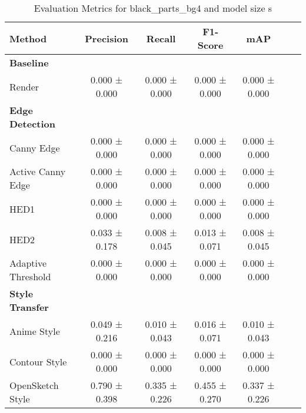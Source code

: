 \begin{table}[H]
    \scriptsize
    \caption{Evaluation Metrics for black_parts_bg4 and model size s}
    \begin{tabular}{lcccccc}
        \toprule
        \textbf{Method} & \textbf{Precision} & \textbf{Recall} & \textbf{F1-Score} & \textbf{mAP} \\
        \midrule
        \textbf{Baseline} & & & & \\
        Render & 0.000 ± 0.000 & 0.000 ± 0.000 & 0.000 ± 0.000 & 0.000 ± 0.000 \\
        \midrule
        \textbf{Edge Detection} & & & & \\
        Canny Edge & 0.000 ± 0.000 & 0.000 ± 0.000 & 0.000 ± 0.000 & 0.000 ± 0.000 \\
        Active Canny Edge & 0.000 ± 0.000 & 0.000 ± 0.000 & 0.000 ± 0.000 & 0.000 ± 0.000 \\
        HED1 & 0.000 ± 0.000 & 0.000 ± 0.000 & 0.000 ± 0.000 & 0.000 ± 0.000 \\
        HED2 & 0.033 ± 0.178 & 0.008 ± 0.045 & 0.013 ± 0.071 & 0.008 ± 0.045 \\
        Adaptive Threshold & 0.000 ± 0.000 & 0.000 ± 0.000 & 0.000 ± 0.000 & 0.000 ± 0.000 \\
        \midrule
        \textbf{Style Transfer} & & & & \\
        Anime Style & 0.049 ± 0.216 & 0.010 ± 0.043 & 0.016 ± 0.071 & 0.010 ± 0.043 \\
        Contour Style & 0.000 ± 0.000 & 0.000 ± 0.000 & 0.000 ± 0.000 & 0.000 ± 0.000 \\
        OpenSketch Style & 0.790 ± 0.398 & 0.335 ± 0.226 & 0.455 ± 0.270 & 0.337 ± 0.226 \\
        \bottomrule
    \end{tabular}
\end{table}
